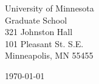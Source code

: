 \begin{minipage}{0.49\textwidth}
\begin{flushleft}
\noindent
University of Minnesota\\
Graduate School \\
321 Johnston Hall \\
101 Pleasant St. S.E.\\
Minneapolis, MN 55455 
\end{flushleft}
\end{minipage}
\begin{minipage}{0.47\textwidth}
\begin{flushright}
\today
\end{flushright}
\end{minipage} \\

\newcommand{\univ}{University of Minnesota}
\newcommand{\univshort}{UM}
\newcommand{\degree}{Ph.D.}
\newcommand{\dept}{Computer Science}
